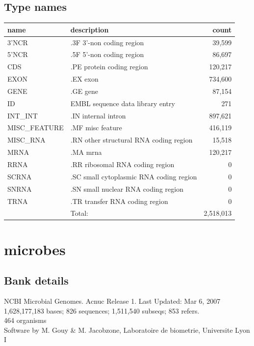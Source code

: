 \documentclass{article}
\begin{document}
\begin{Schunk}
\subsection{Type names}
\noindent\begin{tabular}{llr}
\hline \hline
name & description & count \\
\hline
3'NCR  &  .3F  3'-non coding region  &  39,599 \\
5'NCR  &  .5F  5'-non coding region  &  86,697 \\
CDS  &  .PE protein coding region  &  120,217 \\
EXON  &  .EX exon  &  734,600 \\
GENE  &  .GE gene  &  87,154 \\
ID  &  EMBL sequence data library entry  &  271 \\
INT\_INT  &  .IN  internal intron  &  897,621 \\
MISC\_FEATURE  &  .MF misc feature  &  416,119 \\
MISC\_RNA  &  .RN other structural RNA coding region  &  15,518 \\
MRNA  &  .MA mrna  &  120,217 \\
RRNA  &  .RR ribosomal RNA coding region  &  0 \\
SCRNA  &  .SC small cytoplasmic RNA coding region  &  0 \\
SNRNA  &  .SN small nuclear RNA coding region  &  0 \\
TRNA  &  .TR transfer RNA coding region  &  0 \\
\hline
 & Total: & 2,518,013 \\
\hline \hline
\end{tabular}

\section{ microbes }
\subsection{Bank details}
NCBI Microbial Genomes. Acnuc Release 1. Last Updated: Mar  6, 2007\\
1,628,177,183 bases; 826 sequences; 1,511,540 subseqs; 853 refers.\\
464 organisms\\
Software by M. Gouy \& M. Jacobzone, Laboratoire de biometrie, Universite Lyon I


\end{Schunk}
\end{document}
